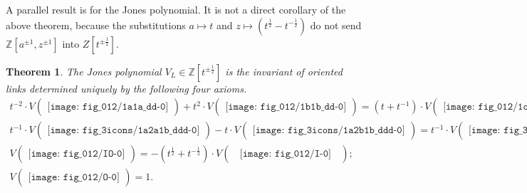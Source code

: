 \documentclass[12pt]{amsart}
\newtheorem{thm}{Theorem}[section]
\theoremstyle{definition}
\theoremstyle{remark}
\begin{document}
A parallel result is for the Jones polynomial.
It is not a direct corollary of the above theorem,
because the substitutions $a\mapsto t$ and $z\mapsto (t^{\frac12}-t^{-\frac12})$
do not send $\mathbb Z[a^{\pm1},z^{\pm1}]$ into $Z[t^{\pm\frac12}]$.

\begin{thm}
\label{thm:Jones}
The Jones polynomial $V_L \in \mathbb Z[t^{\pm\frac12}]$ is
the invariant of oriented links
determined uniquely by the following four axioms.
{\allowdisplaybreaks
\begin{gather*}
t^{-2}\cdot V
\begin{pmatrix}
\texttt{[image: fig\_012/1a1a\_dd-0]}
\end{pmatrix}
+t^2\cdot V
\begin{pmatrix}
\texttt{[image: fig\_012/1b1b\_dd-0]}
\end{pmatrix}
=(t+t^{-1})
\cdot V
\begin{pmatrix}
\texttt{[image: fig\_012/1oo\_dd-0]}
\end{pmatrix} ;
\tag*{\rm(II$_V$)}
\\
t^{-1}\cdot V
\begin{pmatrix}
\texttt{[image: fig\_3icons/1a2a1b\_ddd-0]}
\end{pmatrix}
-t\cdot V
\begin{pmatrix}
\texttt{[image: fig\_3icons/1a2b1b\_ddd-0]}
\end{pmatrix}
=
t^{-1}\cdot V
\begin{pmatrix}
\texttt{[image: fig\_3icons/1b2a1a\_ddd-0]}
\end{pmatrix}
-t\cdot V
\begin{pmatrix}
\texttt{[image: fig\_3icons/1b2b1a\_ddd-0]}
\end{pmatrix} ;
\tag*{\rm(III$_V$)}
\\
V
\begin{pmatrix}
\texttt{[image: fig\_012/IO-0]}
\end{pmatrix}
=-(t^{\frac12}+t^{-\frac12})\cdot
V
\begin{pmatrix}
\;\;
\texttt{[image: fig\_012/I-0]}
\;\;
\end{pmatrix} ;
\tag*{\rm(IO$_V$)}
\\
V
\begin{pmatrix}
\texttt{[image: fig\_012/O-0]}
\end{pmatrix}
=1 .
\tag*{\rm(O$_V$)}
\end{gather*}
}
\end{thm}
\end{document}
